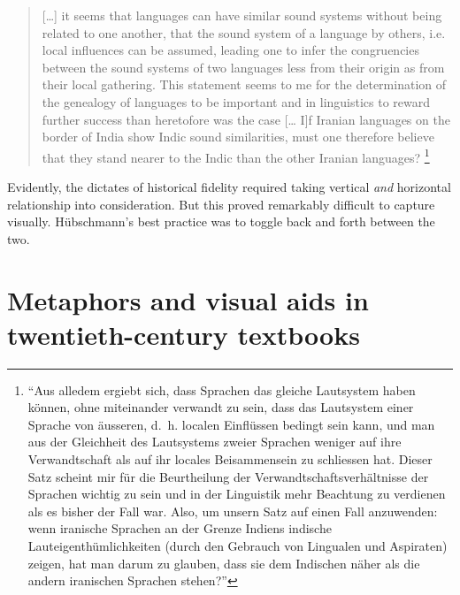\documentclass[output=paper]{langscibook}
\begin{document}
\begin{quotation}
[…] it seems that languages can have similar sound systems without being related to one another, that the sound system of a language by others, i.e. local influences can be assumed, leading one to infer the congruencies between the sound systems of two languages less from their origin as from their local gathering. This statement seems to me for the determination of the genealogy of languages to be important and in linguistics to reward further success than heretofore was the case [… I]f Iranian languages on the border of India show Indic sound similarities, must one therefore believe that they stand nearer to the Indic than the other Iranian languages? \citep[66]{Huebschmann1876}\footnote{``Aus alledem ergiebt sich, dass Sprachen das gleiche Lautsystem haben können, ohne miteinander verwandt zu sein, dass das Lautsystem einer Sprache von äusseren, d.~h. localen Einflüssen bedingt sein kann, und man aus der Gleichheit des Lautsystems zweier Sprachen weniger auf ihre Verwandtschaft als auf ihr locales Beisammensein zu schliessen hat. Dieser Satz scheint mir für die Beurtheilung der Verwandtschaftsverhältnisse der Sprachen wichtig zu sein und in der Linguistik mehr Beachtung zu verdienen als es bisher der Fall war. Also, um unsern Satz auf einen Fall anzuwenden: wenn iranische Sprachen an der Grenze Indiens indische Lauteigenthümlichkeiten (durch den Gebrauch von Lingualen und Aspiraten) zeigen, hat man darum zu glauben, dass sie dem Indischen näher als die andern iranischen Sprachen stehen?''}
\end{quotation}

Evidently, the dictates of historical fidelity required taking vertical \emph{and} horizontal relationship into consideration. But this proved remarkably difficult to capture visually. Hübschmann's best practice was to toggle back and forth between the two.

\section{Metaphors and visual aids in twentieth-century textbooks}
\label{sec:kaplan:textbooks}
\end{document}
